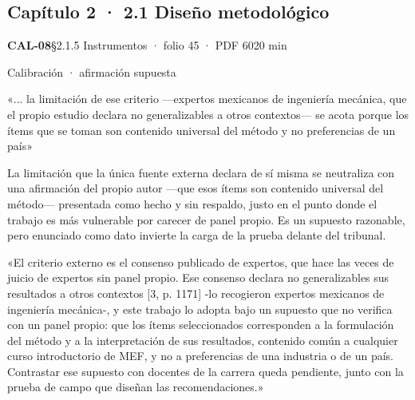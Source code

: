 \subsection{Capítulo 2 · 2.1 Diseño metodológico}
\noindent\casilla\textbf{CAL-08}\quad{}\quad §2.1.5 Instrumentos · folio 45 · PDF 60\hfill 20 min\par\vspace{1pt}
{\small\color{gris}Calibración · afirmación supuesta}\par
\begin{dice}«... la limitación de ese criterio —expertos mexicanos de ingeniería mecánica, que el propio estudio declara no generalizables a otros contextos— se acota porque los ítems que se toman son contenido universal del método y no preferencias de un país»\end{dice}
{\small{}La limitación que la única fuente externa declara de sí misma se neutraliza con una afirmación del propio autor —que esos ítems son contenido universal del método— presentada como hecho y sin respaldo, justo en el punto donde el trabajo es más vulnerable por carecer de panel propio. Es un supuesto razonable, pero enunciado como dato invierte la carga de la prueba delante del tribunal.\par}
\begin{debedecir}«El criterio externo es el consenso publicado de expertos, que hace las veces de juicio de expertos sin panel propio. Ese consenso declara no generalizables sus resultados a otros contextos [3, p. 1171]\allowbreak{} -lo recogieron expertos mexicanos de ingeniería mecánica-, y este trabajo lo adopta bajo un supuesto que no verifica con un panel propio: que los ítems seleccionados corresponden a la formulación del método y a la interpretación de sus resultados, contenido común a cualquier curso introductorio de MEF, y no a preferencias de una industria o de un país. Contrastar ese supuesto con docentes de la carrera queda pendiente, junto con la prueba de campo que diseñan las recomendaciones.»\end{debedecir}
\vspace{6pt}
